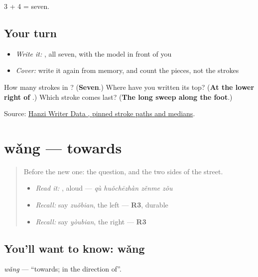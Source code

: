 3 + 4 = seven.

\subsection*{Your turn}
\begin{itemize}
\raggedright
  \item \emph{Write it:} , all seven, with the model in front of you
  \item \emph{Cover:} write it again from memory, and count the pieces, not the strokes
\end{itemize}

\begin{tcolorbox}[breakable,colback=teal!4,colframe=teal!35!black,title={Before you move on}]
How many strokes in ? (\textbf{Seven}.) Where have you written its top? (\textbf{At the lower right of }.) Which stroke comes last? (\textbf{The long sweep along the foot}.)

Source: \href{https://raw.githubusercontent.com/chanind/hanzi-writer-data/68d10a4b21150cae5e1ebbd223eed289cf32d90c/data/\%E8\%B5\%B0.json}{Hanzi Writer Data , pinned stroke paths and medians}.
\end{tcolorbox}
\section[wǎng]{wǎng — towards}

\label{lesson:ZH-C283-wang}



\begin{quote}
Before the new one: the question, and the two sides of the street.

\begin{itemize}
\raggedright
  \item \emph{Read it:} , aloud — \emph{qù huǒchēzhàn zěnme zǒu}
  \item \emph{Recall:} say \emph{zuǒbian}, the left — \textbf{R3}, durable
  \item \emph{Recall:} say \emph{yòubian}, the right — \textbf{R3}
\end{itemize}
\end{quote}

\subsection*{You'll want to know: wǎng}
\emph{wǎng} — \textquotedblleft{}towards; in the direction of\textquotedblright{}.

